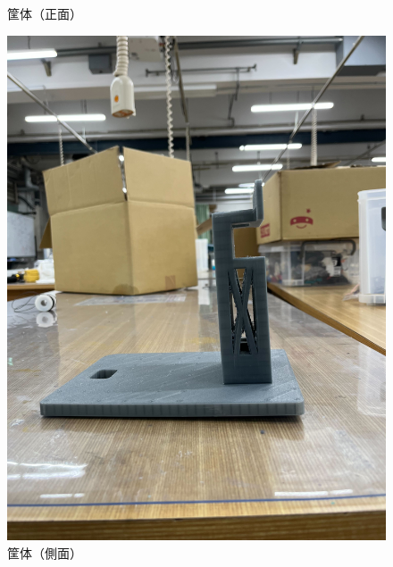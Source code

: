 \documentclass[10pt, oneside, titlepage]{ltjarticle}  %
\begin{document}
\begin{figure}[H]
\begin{minipage}{0.48\textwidth}
      \caption{筐体（正面）}
      \label{body1}
    \end{minipage}
    \hfill
    \begin{minipage}{0.48\textwidth}
      \centering
      \includegraphics[width=\textwidth]{figures/body2.jpg}
      \caption{筐体（側面）}
      \label{body2}
    \end{minipage}
  \end{figure}
\end{document}
